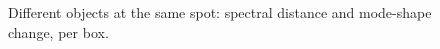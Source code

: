 \begin{figure}[t]
\centering

\caption{Different objects at the same spot: spectral distance and mode-shape change, per box.}
\label{fig:objects_same_spot}
\end{figure}
